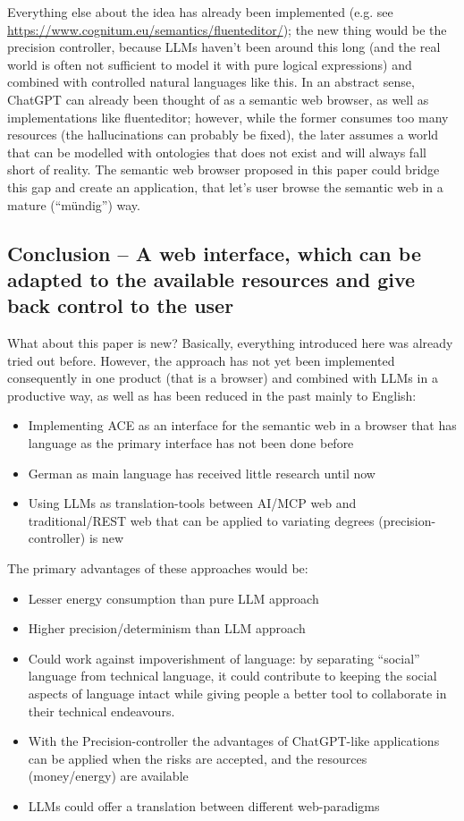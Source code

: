 \documentclass[12pt,a4paper]{article}
\begin{document}
Everything else about the idea has already been implemented (e.g. see \url{https://www.cognitum.eu/semantics/fluenteditor/}); the new thing would be the precision controller, because LLMs haven't been around this long (and the real world is often not sufficient to model it with pure logical expressions) and combined with controlled natural languages like this. In an abstract sense, ChatGPT can already been thought of as a semantic web browser, as well as implementations like fluenteditor; however, while the former consumes too many resources (the hallucinations can probably be fixed), the later assumes a world that can be modelled with ontologies that does not exist and will always fall short of reality. The semantic web browser proposed in this paper could bridge this gap and create an application, that let's user browse the semantic web in a mature (``mündig'') way.

\subsection{Conclusion -- A web interface, which can be adapted to the available resources and give back control to the user}

What about this paper is new? Basically, everything introduced here was already tried out before. However, the approach has not yet been implemented consequently in one product (that is a browser) and combined with LLMs in a productive way, as well as has been reduced in the past mainly to English:
\begin{itemize}
    \item Implementing ACE as an interface for the semantic web in a browser that has language as the primary interface has not been done before
    \item German as main language has received little research until now
    \item Using LLMs as translation-tools between AI/MCP web and traditional/REST web that can be applied to variating degrees (precision-controller) is new
\end{itemize}

The primary advantages of these approaches would be:
\begin{itemize}
    \item Lesser energy consumption than pure LLM approach
    \item Higher precision/determinism than LLM approach
    \item Could work against impoverishment of language: by separating ``social'' language from technical language, it could contribute to keeping the social aspects of language intact while giving people a better tool to collaborate in their technical endeavours.
    \item With the Precision-controller the advantages of ChatGPT-like applications can be applied when the risks are accepted, and the resources (money/energy) are available
    \item LLMs could offer a translation between different web-paradigms
\end{itemize}
\end{document}
